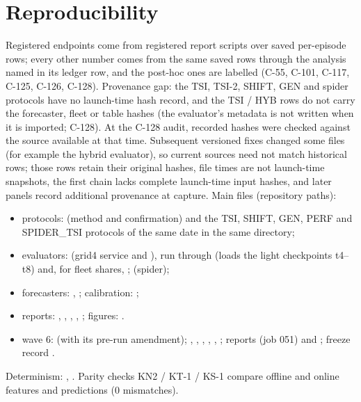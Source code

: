 \section{Reproducibility}\label{app:repro}
Registered endpoints come from registered report scripts over saved per-episode rows; every other number comes from the same saved rows
through the analysis named in its ledger row, and the post-hoc ones are labelled (C-55, C-101, C-117, C-125, C-126, C-128).
Provenance gap: the TSI, TSI-2, SHIFT, GEN and spider protocols have no launch-time hash record, and the TSI / HYB rows do not carry the
forecaster, fleet or table hashes (the evaluator's metadata is not written when it is imported; C-128). At the C-128 audit, recorded hashes were checked
against the source available at that time. Subsequent versioned fixes changed some files (for example the hybrid evaluator), so current
sources need not match historical rows; those rows retain their original hashes, file times are not launch-time snapshots, the first chain
lacks complete launch-time input hashes, and later panels record additional provenance at capture. Main files (repository paths):
\begin{itemize}\setlength\itemsep{0pt}
\item protocols:  (method and confirmation) and the TSI, SHIFT, GEN, PERF and
SPIDER\_TSI protocols of the same date in the same directory;
\item evaluators:  (grid4 service and ), run through
 (loads the light checkpoints t4--t8) and, for fleet shares, ;  (spider);
\item forecasters: , ; calibration: ;
\item reports: , , , ,
; figures: .
\item wave 6:  (with its pre-run amendment); ,
, , , , ; reports
 (job 051) and ; freeze record .
\end{itemize}
Determinism: , . Parity checks KN2 / KT-1 / KS-1 compare offline and online features and
predictions (0 mismatches).

